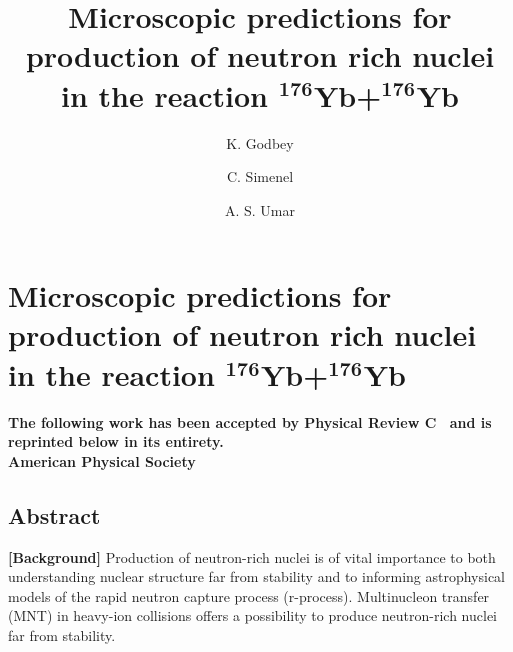 
\chapter{Microscopic predictions for production of neutron rich nuclei in the reaction $^\mathbf{176}\mathbf{Yb}$+${}^\mathbf{176}\mathbf{Yb}$}\label{chapters:chapter_8}

\title{Microscopic predictions for production of neutron rich nuclei in the reaction $^\mathbf{176}\mathbf{Yb}$+${}^\mathbf{176}\mathbf{Yb}$}

\author[1]{K. Godbey}
\author[2]{C. Simenel}
\author[1]{A. S. Umar}


{

	\makeatletter

	\begin{center}
		\AB@authlist
		\AB@affillist
	\end{center}
	\makeatother
	
	\bfseries\centering
	The following work has been accepted by Physical Review C~\citep{godbey2020b} and is reprinted below in its entirety.\\
	 American Physical Society\\
}
\makeatletter
\renewcommand{\AB@affillist}{}
\renewcommand{\AB@authlist}{}
\setcounter{authors}{0}
\makeatother


\section{Abstract}

		{\bf [Background]}
		Production of neutron-rich nuclei is of vital importance to both understanding nuclear structure far from stability and to informing astrophysical models of the rapid neutron capture process (r-process). Multinucleon transfer (MNT) in heavy-ion collisions offers a possibility to produce neutron-rich nuclei far from stability.
		
